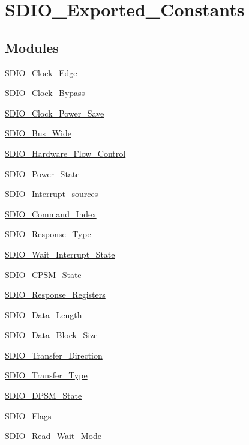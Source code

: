 \hypertarget{group__SDIO__Exported__Constants}{
\section{SDIO\_\-Exported\_\-Constants}
\label{group__SDIO__Exported__Constants}
}
\subsection*{Modules}
\begin{DoxyCompactItemize}
\item 
\hyperlink{group__SDIO__Clock__Edge}{SDIO\_\-Clock\_\-Edge}
\item 
\hyperlink{group__SDIO__Clock__Bypass}{SDIO\_\-Clock\_\-Bypass}
\item 
\hyperlink{group__SDIO__Clock__Power__Save}{SDIO\_\-Clock\_\-Power\_\-Save}
\item 
\hyperlink{group__SDIO__Bus__Wide}{SDIO\_\-Bus\_\-Wide}
\item 
\hyperlink{group__SDIO__Hardware__Flow__Control}{SDIO\_\-Hardware\_\-Flow\_\-Control}
\item 
\hyperlink{group__SDIO__Power__State}{SDIO\_\-Power\_\-State}
\item 
\hyperlink{group__SDIO__Interrupt__sources}{SDIO\_\-Interrupt\_\-sources}
\item 
\hyperlink{group__SDIO__Command__Index}{SDIO\_\-Command\_\-Index}
\item 
\hyperlink{group__SDIO__Response__Type}{SDIO\_\-Response\_\-Type}
\item 
\hyperlink{group__SDIO__Wait__Interrupt__State}{SDIO\_\-Wait\_\-Interrupt\_\-State}
\item 
\hyperlink{group__SDIO__CPSM__State}{SDIO\_\-CPSM\_\-State}
\item 
\hyperlink{group__SDIO__Response__Registers}{SDIO\_\-Response\_\-Registers}
\item 
\hyperlink{group__SDIO__Data__Length}{SDIO\_\-Data\_\-Length}
\item 
\hyperlink{group__SDIO__Data__Block__Size}{SDIO\_\-Data\_\-Block\_\-Size}
\item 
\hyperlink{group__SDIO__Transfer__Direction}{SDIO\_\-Transfer\_\-Direction}
\item 
\hyperlink{group__SDIO__Transfer__Type}{SDIO\_\-Transfer\_\-Type}
\item 
\hyperlink{group__SDIO__DPSM__State}{SDIO\_\-DPSM\_\-State}
\item 
\hyperlink{group__SDIO__Flags}{SDIO\_\-Flags}
\item 
\hyperlink{group__SDIO__Read__Wait__Mode}{SDIO\_\-Read\_\-Wait\_\-Mode}
\end{DoxyCompactItemize}

